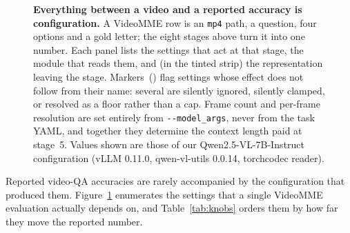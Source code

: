 \documentclass[10pt]{article}
\begin{document}
\begin{figure}[t]
\centering

\caption{\textbf{Everything between a video and a reported accuracy is
configuration.} A VideoMME row is an \texttt{mp4} path, a question, four options
and a gold letter; the eight stages above turn it into one number. Each panel
lists the settings that act at that stage, the module that reads them, and
(in the tinted strip) the representation leaving the stage. Markers~(\warnmark)
flag settings whose effect does not follow from their name: several are silently
ignored, silently clamped, or resolved as a floor rather than a cap. Frame count
and per-frame resolution are set entirely from \texttt{-{}-model\_args}, never
from the task YAML, and together they determine the context length paid at
stage~5. Values shown are those of our Qwen2.5-VL-7B-Instruct configuration
(vLLM 0.11.0, qwen-vl-utils 0.0.14, torchcodec reader).}
\label{fig:eval-pipeline}
\end{figure}

\begin{table}[t]
\centering
\caption{\textbf{Where an unexplained gap between two evaluation runs comes
from}, ordered by the size of the effect we observe. Stage numbers refer to
Figure~\ref{fig:eval-pipeline}.}
\label{tab:knobs}

\end{table}

\noindent Reported video-QA accuracies are rarely accompanied by the
configuration that produced them. Figure~\ref{fig:eval-pipeline} enumerates the
settings that a single VideoMME evaluation actually depends on, and
Table~\ref{tab:knobs} orders them by how far they move the reported number.
\end{document}
